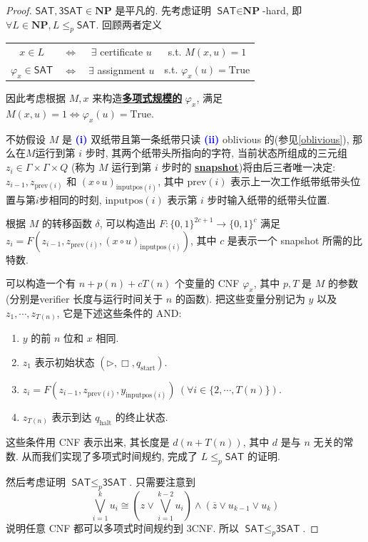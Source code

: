 \documentclass[8pt]{article}
\theoremstyle{compact}
\def\obj#1{\textbf{\uline{#1}}}
\def\num#1{\textnormal{\textbf{\mbox{\textcolor{blue}{(#1)}}}}}
\def\le{\leqslant}
\def\NP{\textbf{NP}}
\begin{document}
\begin{proof}
	$\textsf{SAT}, \textsf{3SAT} \in \NP$ 是平凡的. 先考虑证明 $\textsf{SAT} \in \NP$-hard, 即 $\forall L \in \NP, L \le_p \textsf{SAT}$. 回顾两者定义
	\begin{center}		
		\begin{tabular}{cccc}
			$x \in L$ & $\Leftrightarrow$ & $\exists$ certificate $u$ & s.t. $M(x, u) = 1$\\
			$\varphi_x \in \textsf{SAT}$ & $\Leftrightarrow$ & $\exists$ assignment $u$ & s.t. $\varphi_x(u) = \text{True}$\\
		\end{tabular}
	\end{center}
	因此考虑根据 $M, x$ 来构造\obj{多项式规模的} $\varphi_x$, 满足 $M(x, u) = 1 \Leftrightarrow \varphi_x(u) = \text{True}$. 
	
	不妨假设 $M$ 是 \num{i} 双纸带且第一条纸带只读 \num{ii} oblivious 的(参见\cref{oblivious}), 那么在$M$运行到第 $i$ 步时, 其两个纸带头所指向的字符, 当前状态所组成的三元组 $z_i \in \Gamma \times \Gamma \times Q$ (称为 $M$ 运行到第 $i$ 步时的 \obj{snapshot})将由后三者唯一决定: $z_{i-1}, z_{\text{prev}(i)}$ 和 $(x \circ u)_{\text{inputpos}(i)}$, 其中 $\text{prev}(i)$ 表示上一次工作纸带纸带头位置与第$i$步相同的时刻, $\text{inputpos}(i)$ 表示第 $i$ 步时输入纸带的纸带头位置.

	根据 $M$ 的转移函数 $\delta$, 可以构造出 $F: \{0, 1\}^{2c+1} \to \{0, 1\}^c$ 满足 $z_i = F(z_{i-1}, z_{\text{prev}(i)}, (x \circ u)_{\text{inputpos}(i)})$, 其中 $c$ 是表示一个 snapshot 所需的比特数. 

	可以构造一个有 $n + p(n) + cT(n)$ 个变量的 CNF $\varphi_x$, 其中 $p, T$ 是 $M$ 的参数(分别是verifier 长度与运行时间关于 $n$ 的函数). 把这些变量分别记为 $y$ 以及 $z_1, \cdots, z_{T(n)}$, 它是下述这些条件的 AND:
	\begin{enumerate}
		\item $y$ 的前 $n$ 位和 $x$ 相同.
		\item $z_1$ 表示初始状态 $(\triangleright, \Box, q_{\text{start}})$.
		\item $z_i = F(z_{i-1}, z_{\text{prev}(i)}, y_{\text{inputpos}(i)}) \ (\forall i \in \{2, \cdots, T(n)\})$.
		\item $z_{T(n)}$ 表示到达 $q_{\text{halt}}$ 的终止状态.
	\end{enumerate}

	这些条件用 CNF 表示出来, 其长度是 $d(n + T(n))$, 其中 $d$ 是与 $n$ 无关的常数. 从而我们实现了多项式时间规约, 完成了 $L \le_p \textsf{SAT}$ 的证明.

	然后考虑证明 $\textsf{SAT} \le_p \textsf{3SAT}$. 只需要注意到
	$$\bigvee_{i=1}^{k}u_i \cong \left(z \vee \bigvee_{i=1}^{k-2}u_i\right) \wedge (\overline{z} \vee u_{k-1} \vee u_{k})$$
	说明任意 CNF 都可以多项式时间规约到 3CNF. 所以 $\textsf{SAT} \le_p \textsf{3SAT}$.
\end{proof}
\end{document}
